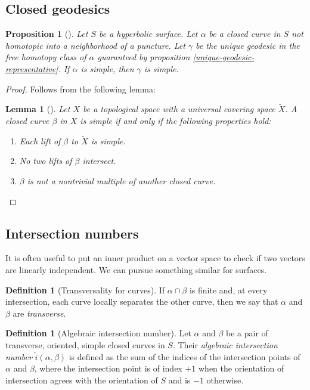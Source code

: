 \documentclass[reqno]{amsart}
\newtheorem{lemma}[theorem]{Lemma}
\newtheorem{proposition}[theorem]{Proposition}
\theoremstyle{definition}
\newtheorem{definition}[theorem]{Definition}
\theoremstyle{remark}
\begin{document}
\subsection*{Closed geodesics}

\begin{proposition}[]
    Let $S$ be a hyperbolic surface. Let $\alpha$ be a closed curve
    in $S$ not homotopic into a neighborhood of a puncture. Let
    $\gamma$ be the unique geodesic in the free homotopy class of
    $\alpha$ guaranteed by proposition \ref{unique-geodesic-representative}.
    If $\alpha$ is simple, then $\gamma$ is simple.
\end{proposition}

\begin{proof}
    Follows from the following lemma:
    \begin{lemma}[]\label{simple-loop-lifts}
        Let $X$ be a topological space with a universal covering space
         $\tilde{X}$. A closed curve $\beta$ in $X$ is simple if and
        only if the following properties hold:
        \begin{enumerate}
            \item Each lift of $\beta$ to $\tilde{X}$ is simple.
            \item No two lifts of $\beta$ intersect.
            \item  $\beta$ is not a nontrivial multiple of another closed
                curve.
         \end{enumerate}
    \end{lemma}
\end{proof}

\subsection*{Intersection numbers}

It is often useful to put an inner product on a vector space to check
if two vectors are linearly independent. We can pursue something similar for
surfaces.


\begin{definition}[Transversality for curves]
If $\alpha \cap \beta$ is finite and, at every intersection, each
curve locally separates the other curve, then we say that
$\alpha$ and $\beta$ are \textit{transverse}.
\end{definition}

\begin{definition}[Algebraic intersection number]
    Let $\alpha$ and $\beta$ be a pair of transverse, oriented,
    simple closed curves in $S$. Their \textit{algebraic intersection
    number} $\hat{i}\left( \alpha,\beta \right) $ is
    defined as the sum of the indices
    of the intersection points of $\alpha$ and $\beta$,
    where the intersection point is of index $+1$ when the
    orientation of intersection agrees with
    the orientation of $S$ and is $-1$ otherwise.
\end{definition}
\end{document}
